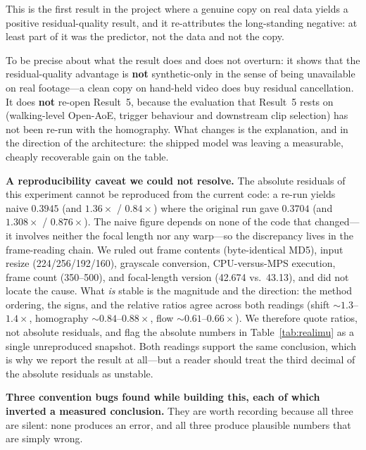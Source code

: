 \documentclass[12pt,a4paper]{article}
\begin{document}
This is the first result in the project where a genuine copy on real data yields a positive residual-quality result, and it re-attributes the long-standing negative: at least part of it was the predictor, not the data and not the copy.

To be precise about what the result does and does not overturn: it shows that the residual-quality advantage is \textbf{not} synthetic-only in the sense of being unavailable on real footage---a clean copy on hand-held video does buy residual cancellation. It does \textbf{not} re-open Result~5, because the evaluation that Result~5 rests on (walking-level Open-AoE, trigger behaviour and downstream clip selection) has not been re-run with the homography. What changes is the explanation, and in the direction of the architecture: the shipped model was leaving a measurable, cheaply recoverable gain on the table.

\textbf{A reproducibility caveat we could not resolve.} The absolute residuals of this experiment cannot be reproduced from the current code: a re-run yields naive $0.3945$ (and $1.36\times$ / $0.84\times$) where the original run gave $0.3704$ (and $1.308\times$ / $0.876\times$). The naive figure depends on none of the code that changed---it involves neither the focal length nor any warp---so the discrepancy lives in the frame-reading chain. We ruled out frame contents (byte-identical MD5), input resize (224/256/192/160), grayscale conversion, CPU-versus-MPS execution, frame count (350--500), and focal-length version (42.674 vs.\ 43.13), and did not locate the cause. What \emph{is} stable is the magnitude and the direction: the method ordering, the signs, and the relative ratios agree across both readings (shift ${\sim}1.3$--$1.4\times$, homography ${\sim}0.84$--$0.88\times$, flow ${\sim}0.61$--$0.66\times$). We therefore quote ratios, not absolute residuals, and flag the absolute numbers in Table~\ref{tab:realimu} as a single unreproduced snapshot. Both readings support the same conclusion, which is why we report the result at all---but a reader should treat the third decimal of the absolute residuals as unstable.

\textbf{Three convention bugs found while building this, each of which inverted a measured conclusion.} They are worth recording because all three are silent: none produces an error, and all three produce plausible numbers that are simply wrong.
\end{document}
